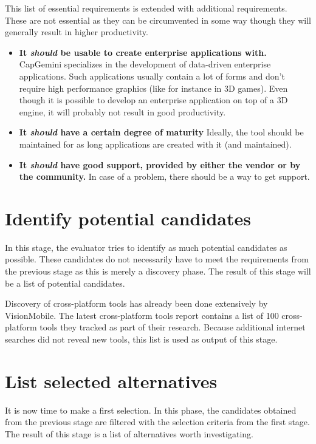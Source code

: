 This list of essential requirements is extended with additional requirements. These are not essential as they can be circumvented in some way though they will generally result in higher productivity.
    
\begin{itemize}    
    \item \textbf{It \emph{should} be usable to create enterprise applications with.} CapGemini specializes in the development of data-driven enterprise applications. Such applications usually contain a lot of forms and don't require high performance graphics (like for instance in 3D games). Even though it is possible to develop an enterprise application on top of a 3D engine, it will probably not result in good productivity.
    \item \textbf{It \emph{should} have a certain degree of maturity} Ideally, the tool should be maintained for as long applications are created with it (and maintained). 
    \item \textbf{It \emph{should} have good support, provided by either the vendor or by the community.} In case of a problem, there should be a way to get support.
\end{itemize}

\section{Identify potential candidates}

In this stage, the evaluator tries to identify as much potential candidates as possible. These candidates do not necessarily have to meet the requirements from the previous stage as this is merely a discovery phase. The result of this stage will be a list of potential candidates.

Discovery of cross-platform tools has already been done extensively by VisionMobile. The latest cross-platform tools report \cite{} contains a list of 100 cross-platform tools they tracked as part of their research. Because additional internet searches did not reveal new tools, this list is used as output of this stage.

\section{List selected alternatives}

It is now time to make a first selection. In this phase, the candidates obtained from the previous stage are filtered with the selection criteria from the first stage. The result of this stage is a list of alternatives worth investigating.


